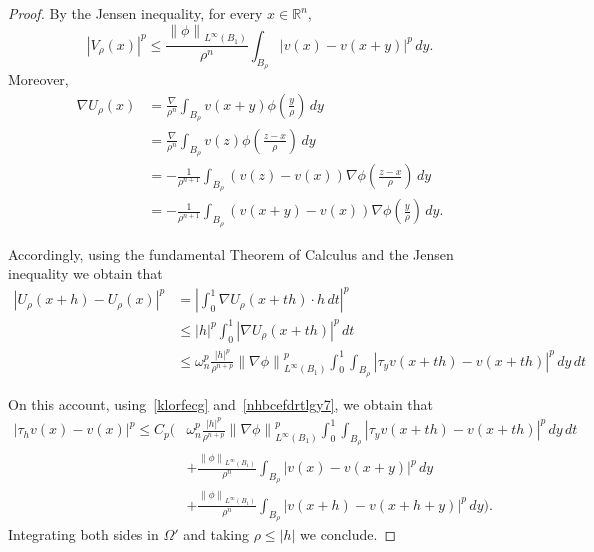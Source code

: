 \documentclass[12pt]{article}
\newcommand{\R}{\mathbb{R}}
\numberwithin{equation}{section}
\renewcommand{\leq}{\leqslant}
\begin{document}
\begin{appendix}
\begin{proof}
By the  Jensen inequality, for every $x\in\R^n$,
\begin{equation}\label{nhbcefdrtlgy7}
\left|V_\rho(x)\right|^p\leq \frac{\left\|\phi\right\|_{L^\infty(B_1)}}{\rho^n}\int_{B_\rho}\left|v(x)-v(x+y)\right|^p\,dy.
\end{equation}
Moreover,
\begin{equation*}
\begin{split}
\nabla U_\rho(x)&=\frac{\nabla}{\rho^n}\int_{B_\rho}v(x+y)\phi\left(\frac{y}{\rho}\right)\,dy\\
&=\frac{\nabla}{\rho^n}\int_{B_\rho}v(z)\phi\left(\frac{z-x}{\rho}\right)\,dy\\
&=-\frac{1}{\rho^{n+1}}\int_{B_\rho}\left(v(z)-v(x)\right)\nabla \phi\left(\frac{z-x}{\rho}\right)\,dy\\
&=-\frac{1}{\rho^{n+1}}\int_{B_\rho}\left(v(x+y)-v(x)\right)\nabla \phi\left(\frac{y}{\rho}\right)\,dy.
\end{split}
\end{equation*}

Accordingly, using the fundamental Theorem of Calculus and the Jensen inequality we obtain that
\begin{equation*}
\begin{split}
\left|U_\rho(x+h)-U_\rho(x)\right|^p&=\left|\int_{0}^1 \nabla U_{\rho}(x+th)\cdot h\,dt\right|^p\\
&\leq \left|h\right|^p\int_{0}^1 \left|\nabla U_{\rho}(x+th)\right|^p\,dt\\
&\leq \omega_n^p\frac{\left|h\right|^p}{\rho^{n+p}}\left\|\nabla \phi\right\|_{L^\infty(B_1)}^p\int_{0}^1\int_{B_{\rho}}\left|\tau_y v(x+th)-v(x+th)\right|^p\,dy\,dt
\end{split}
\end{equation*}

On this account, using~\eqref{klorfecg} and~\eqref{nhbcefdrtlgy7}, we obtain that 
\begin{equation*}
\begin{split}
\left|\tau_hv(x)-v(x)\right|^p\leq C_p\bigg( & \omega_n^p\frac{\left|h\right|^p}{\rho^{n+p}}\left\|\nabla \phi\right\|_{L^\infty(B_1)}^p\int_{0}^1\int_{B_{\rho}}\left|\tau_y v(x+th)-v(x+th)\right|^p\,dy\,dt\\
&+\frac{\left\|\phi\right\|_{L^\infty(B_1)}}{\rho^n}\int_{B_\rho}\left|v(x)-v(x+y)\right|^p\,dy\\
&+\frac{\left\|\phi\right\|_{L^\infty(B_1)}}{\rho^n}\int_{B_\rho}\left|v(x+h)-v(x+h+y)\right|^p\,dy\bigg).
\end{split}
\end{equation*}
Integrating both sides in $\Omega'$ and taking $\rho\leq \left|h\right|$ we conclude.
\end{proof}





\end{appendix}
\end{document}
